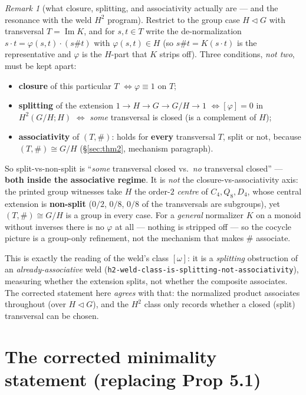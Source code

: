 \documentclass[11pt]{article}
\theoremstyle{plain}
\theoremstyle{definition}
\theoremstyle{remark}
\newtheorem{remark}{Remark}[section]
\renewcommand{\Im}{\operatorname{Im}}
\begin{document}
\begin{remark}[what closure, splitting, and associativity actually are --- and the resonance with the weld $H^2$ program]
Restrict to the group case $H \triangleleft G$ with transversal $T = \Im K$, and for $s, t \in T$
write the de-normalization $s\cdot t = \varphi(s,t)\cdot (s\# t)$ with $\varphi(s,t) \in H$ (so
$s\#t = K(s\cdot t)$ is the representative and $\varphi$ is the $H$-part that $K$ strips off). Three
conditions, \emph{not two}, must be kept apart:
\begin{itemize}[leftmargin=1.6em]
\item \textbf{closure} of this particular $T$ $\iff \varphi \equiv 1$ on $T$;
\item \textbf{splitting} of the extension $1 \to H \to G \to G/H \to 1$ $\iff [\varphi] = 0$ in
  $H^2(G/H; H)$ $\iff$ \emph{some} transversal is closed (is a complement of $H$);
\item \textbf{associativity} of $(T,\#)$: holds for \textbf{every} transversal $T$, split or not,
  because $(T,\#) \cong G/H$ (\S\ref{sec:thm2}, mechanism paragraph).
\end{itemize}
So split-vs-non-split is ``\emph{some} transversal closed vs.\ \emph{no} transversal closed'' ---
\textbf{both inside the associative regime}. It is \emph{not} the closure-vs-associativity axis: the
printed group witnesses take $H$ the order-$2$ \emph{centre} of $C_4, Q_8, D_4$, whose central
extension is \textbf{non-split} ($0/2$, $0/8$, $0/8$ of the transversals are subgroups), yet
$(T,\#)\cong G/H$ is a group in every case. For a \emph{general} normalizer $K$ on a monoid without
inverses there is no $\varphi$ at all --- nothing is stripped off --- so the cocycle picture is a
group-only refinement, not the mechanism that makes $\#$ associate.

This is exactly the reading of the weld's class $[\omega]$: it is a \emph{splitting} obstruction of
an \emph{already-associative} weld (\texttt{h2-weld-class-is-splitting-not-associativity}),
measuring whether the extension splits, not whether the composite associates. The corrected
statement here \emph{agrees} with that: the normalized product associates throughout (over $H
\triangleleft G$), and the $H^2$ class only records whether a closed (split) transversal can be
chosen.
\end{remark}

\section{The corrected minimality statement (replacing Prop 5.1)}
\end{document}

